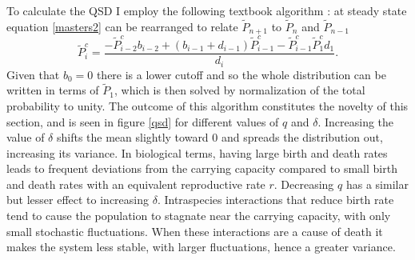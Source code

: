 To calculate the QSD I employ the following textbook algorithm \cite{Nisbet1982}: at steady state equation \ref{masters2} can be rearranged to relate $\tilde{P}_{n+1}$ to $\tilde{P}_n$ and $\tilde{P}_{n-1}$
\begin{equation}
\widetilde{P}^c_{i} = \frac{- \widetilde{P}^c_{i-2}b_{i-2} 
	+ (b_{i-1}+d_{i-1})\widetilde{P}^c_{i-1} 
	- \widetilde{P}^c_{i-1}\widetilde{P}^c_{1}d_{1}}{d_{i}}.
\end{equation}
Given that $b_0=0$ there is a lower cutoff and so the whole distribution can be written in terms of $\tilde{P}_1$, which is then solved by normalization of the total probability to unity. 
The outcome of this algorithm constitutes the novelty of this section, and is seen in figure \ref{qsd} for different values of $q$ and $\delta$. 
Increasing the value of $\delta$ shifts the mean slightly toward $0$ and spreads the distribution out, increasing its variance. 
In biological terms, having large birth and death rates leads to frequent deviations from the carrying capacity compared to small birth and death rates with an equivalent reproductive rate $r$. 
Decreasing $q$ has a similar but lesser effect to increasing $\delta$. %
Intraspecies interactions that reduce birth rate tend to cause the population to stagnate near the carrying capacity, with only small stochastic fluctuations. 
When these interactions are a cause of death it makes the system less stable, with larger fluctuations, hence a greater variance. 


